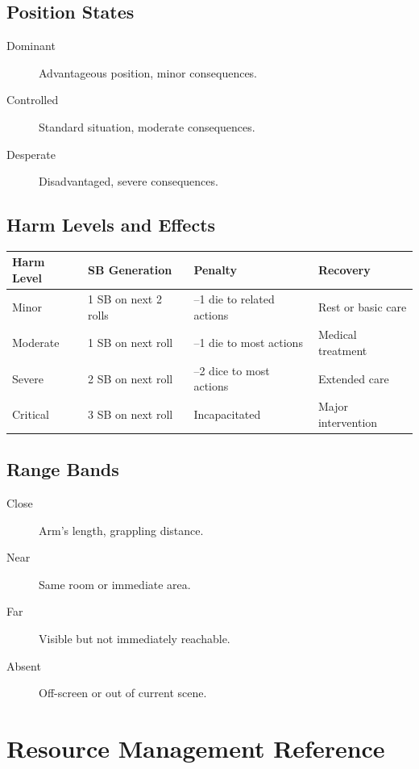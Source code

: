 \subsection{Position States}\label{subsec:position_ref}
\begin{description}
    \item[Dominant] Advantageous position, minor consequences.
    \item[Controlled] Standard situation, moderate consequences.
    \item[Desperate] Disadvantaged, severe consequences.
\end{description}

\subsection{Harm Levels and Effects}\label{subsec:harm_ref}
\begin{center}
\feTableStart
\begin{tabularx}{\linewidth}{@{}l l l l @{}}
\toprule
\textbf{Harm Level} & \textbf{SB Generation} & \textbf{Penalty} & \textbf{Recovery} \\
\midrule
Minor & 1 SB on next 2 rolls & --1 die to related actions & Rest or basic care \\
Moderate & 1 SB on next roll & --1 die to most actions & Medical treatment \\
Severe & 2 SB on next roll & --2 dice to most actions & Extended care \\
Critical & 3 SB on next roll & Incapacitated & Major intervention \\
\bottomrule
\end{tabularx}
\feTableEnd
\end{center}

\subsection{Range Bands}\label{subsec:range_bands_ref}
\begin{description}
    \item[Close] Arm's length, grappling distance.
    \item[Near] Same room or immediate area.
    \item[Far] Visible but not immediately reachable.
    \item[Absent] Off-screen or out of current scene.
\end{description}

\newpage
\section{Resource Management Reference}\label{sec:resource_reference}

